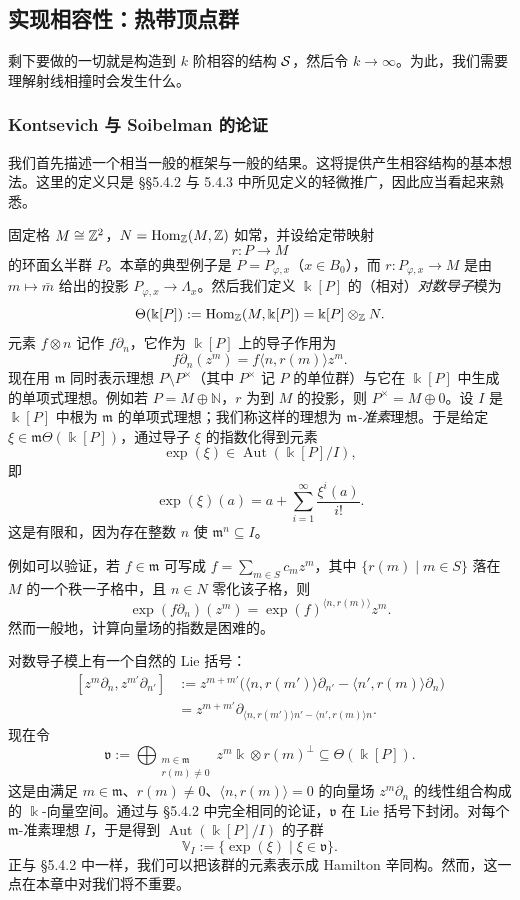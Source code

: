 \subsection{实现相容性：热带顶点群}

剩下要做的一切就是构造到 $k$ 阶相容的结构 $\mathcal{S}$，然后令 $k\to\infty$。为此，我们需要理解射线相撞时会发生什么。

\subsubsection{Kontsevich 与 Soibelman 的论证}

我们首先描述一个相当一般的框架与一般的结果。这将提供产生相容结构的基本想法。这里的定义只是 §§5.4.2 与 5.4.3 中所见定义的轻微推广，因此应当看起来熟悉。

固定格 $M\cong\mathbb{Z}^2$，$N=\operatorname{Hom}_{\mathbb{Z}}(M,\mathbb{Z})$ 如常，并设给定带映射
\[
  r:P\to M
\]
的环面幺半群 $P$。本章的典型例子是 $P=P_{\varphi,x}$（$x\in B_0$），而 $r:P_{\varphi,x}\to M$ 是由 $m\mapsto\bar m$ 给出的投影 $P_{\varphi,x}\to\Lambda_x$。然后我们定义 $\Bbbk[P]$ 的（相对）\emph{对数导子}模为
\[
  \Theta(\Bbbk[P]):=\operatorname{Hom}_{\mathbb{Z}}(M,\Bbbk[P])=\Bbbk[P]\otimes_{\mathbb{Z}} N.
\]
元素 $f\otimes n$ 记作 $f\partial_n$，它作为 $\Bbbk[P]$ 上的导子作用为
\[
  f\partial_n(z^m)=f\langle n,r(m)\rangle z^m.
\]
现在用 $\mathfrak m$ 同时表示理想 $P\setminus P^\times$（其中 $P^\times$ 记 $P$ 的单位群）与它在 $\Bbbk[P]$ 中生成的单项式理想。例如若 $P=M\oplus\mathbb{N}$，$r$ 为到 $M$ 的投影，则 $P^\times=M\oplus0$。设 $I$ 是 $\Bbbk[P]$ 中根为 $\mathfrak m$ 的单项式理想；我们称这样的理想为 \emph{$\mathfrak m$-准素}理想。于是给定 $\xi\in\mathfrak m\Theta(\Bbbk[P])$，通过导子 $\xi$ 的指数化得到元素
\[
  \exp(\xi)\in\operatorname{Aut}(\Bbbk[P]/I),
\]
即
\[
  \exp(\xi)(a)=a+\sum_{i=1}^{\infty}\frac{\xi^i(a)}{i!}.
\]
这是有限和，因为存在整数 $n$ 使 $\mathfrak m^n\subseteq I$。

例如可以验证，若 $f\in\mathfrak m$ 可写成 $f=\sum_{m\in S}c_mz^m$，其中 $\{r(m)\mid m\in S\}$ 落在 $M$ 的一个秩一子格中，且 $n\in N$ 零化该子格，则
\[
  \exp(f\partial_n)(z^m)=\exp(f)^{\langle n,r(m)\rangle}z^m.
\]
然而一般地，计算向量场的指数是困难的。

对数导子模上有一个自然的 Lie 括号：
\[
  \begin{aligned}
    [z^m\partial_n,z^{m'}\partial_{n'}]
    &:=z^{m+m'}\bigl(\langle n,r(m')\rangle\partial_{n'}
    -\langle n',r(m)\rangle\partial_n\bigr)\\
    &=z^{m+m'}\partial_{\langle n,r(m')\rangle n'-\langle n',r(m)\rangle n}.
  \end{aligned}
\]
现在令
\[
  \mathfrak v:=\bigoplus_{\substack{m\in\mathfrak m\\ r(m)\ne0}}
  z^m\Bbbk\otimes r(m)^\perp\subseteq\Theta(\Bbbk[P]).
\]
这是由满足 $m\in\mathfrak m$、$r(m)\ne0$、$\langle n,r(m)\rangle=0$ 的向量场 $z^m\partial_n$ 的线性组合构成的 $\Bbbk$-向量空间。通过与 §5.4.2 中完全相同的论证，$\mathfrak v$ 在 Lie 括号下封闭。对每个 $\mathfrak m$-准素理想 $I$，于是得到 $\operatorname{Aut}(\Bbbk[P]/I)$ 的子群
\[
  \mathbb{V}_I:=\{\exp(\xi)\mid\xi\in\mathfrak v\}.
\]
正与 §5.4.2 中一样，我们可以把该群的元素表示成 Hamilton 辛同构。然而，这一点在本章中对我们将不重要。

